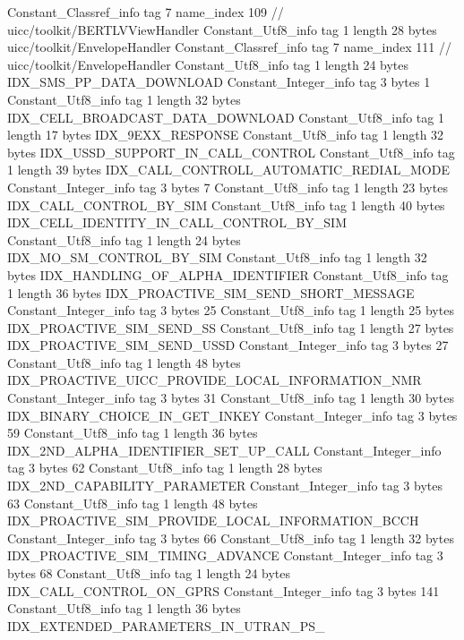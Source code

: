 {{{		}
		Constant_Classref_info {
			tag	7
			name_index	109		// uicc/toolkit/BERTLVViewHandler
		}
		Constant_Utf8_info {
			tag	1
			length	28
			bytes	uicc/toolkit/EnvelopeHandler
		}
		Constant_Classref_info {
			tag	7
			name_index	111		// uicc/toolkit/EnvelopeHandler
		}
		Constant_Utf8_info {
			tag	1
			length	24
			bytes	IDX_SMS_PP_DATA_DOWNLOAD
		}
		Constant_Integer_info {
			tag	3
			bytes	1
		}
		Constant_Utf8_info {
			tag	1
			length	32
			bytes	IDX_CELL_BROADCAST_DATA_DOWNLOAD
		}
		Constant_Utf8_info {
			tag	1
			length	17
			bytes	IDX_9EXX_RESPONSE
		}
		Constant_Utf8_info {
			tag	1
			length	32
			bytes	IDX_USSD_SUPPORT_IN_CALL_CONTROL
		}
		Constant_Utf8_info {
			tag	1
			length	39
			bytes	IDX_CALL_CONTROLL_AUTOMATIC_REDIAL_MODE
		}
		Constant_Integer_info {
			tag	3
			bytes	7
		}
		Constant_Utf8_info {
			tag	1
			length	23
			bytes	IDX_CALL_CONTROL_BY_SIM
		}
		Constant_Utf8_info {
			tag	1
			length	40
			bytes	IDX_CELL_IDENTITY_IN_CALL_CONTROL_BY_SIM
		}
		Constant_Utf8_info {
			tag	1
			length	24
			bytes	IDX_MO_SM_CONTROL_BY_SIM
		}
		Constant_Utf8_info {
			tag	1
			length	32
			bytes	IDX_HANDLING_OF_ALPHA_IDENTIFIER
		}
		Constant_Utf8_info {
			tag	1
			length	36
			bytes	IDX_PROACTIVE_SIM_SEND_SHORT_MESSAGE
		}
		Constant_Integer_info {
			tag	3
			bytes	25
		}
		Constant_Utf8_info {
			tag	1
			length	25
			bytes	IDX_PROACTIVE_SIM_SEND_SS
		}
		Constant_Utf8_info {
			tag	1
			length	27
			bytes	IDX_PROACTIVE_SIM_SEND_USSD
		}
		Constant_Integer_info {
			tag	3
			bytes	27
		}
		Constant_Utf8_info {
			tag	1
			length	48
			bytes	IDX_PROACTIVE_UICC_PROVIDE_LOCAL_INFORMATION_NMR
		}
		Constant_Integer_info {
			tag	3
			bytes	31
		}
		Constant_Utf8_info {
			tag	1
			length	30
			bytes	IDX_BINARY_CHOICE_IN_GET_INKEY
		}
		Constant_Integer_info {
			tag	3
			bytes	59
		}
		Constant_Utf8_info {
			tag	1
			length	36
			bytes	IDX_2ND_ALPHA_IDENTIFIER_SET_UP_CALL
		}
		Constant_Integer_info {
			tag	3
			bytes	62
		}
		Constant_Utf8_info {
			tag	1
			length	28
			bytes	IDX_2ND_CAPABILITY_PARAMETER
		}
		Constant_Integer_info {
			tag	3
			bytes	63
		}
		Constant_Utf8_info {
			tag	1
			length	48
			bytes	IDX_PROACTIVE_SIM_PROVIDE_LOCAL_INFORMATION_BCCH
		}
		Constant_Integer_info {
			tag	3
			bytes	66
		}
		Constant_Utf8_info {
			tag	1
			length	32
			bytes	IDX_PROACTIVE_SIM_TIMING_ADVANCE
		}
		Constant_Integer_info {
			tag	3
			bytes	68
		}
		Constant_Utf8_info {
			tag	1
			length	24
			bytes	IDX_CALL_CONTROL_ON_GPRS
		}
		Constant_Integer_info {
			tag	3
			bytes	141
		}
		Constant_Utf8_info {
			tag	1
			length	36
			bytes	IDX_EXTENDED_PARAMETERS_IN_UTRAN_PS_
}}}

